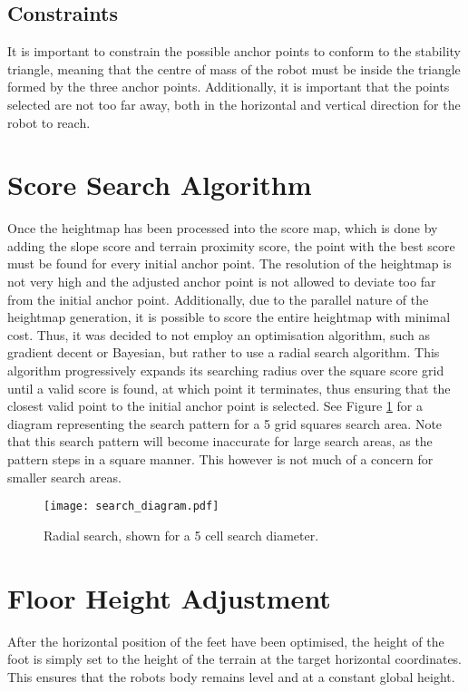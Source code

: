     \subsection{Constraints}
    It is important to constrain the possible anchor points to conform to the stability triangle, meaning that the centre of mass of the robot must be inside the triangle formed by the three anchor points. Additionally, it is important that the points selected are not too far away, both in the horizontal and vertical direction for the robot to reach.


\section{Score Search Algorithm} \label{sec:radial_search}
    Once the heightmap has been processed into the score map, which is done by adding the
    slope score and terrain proximity score, the point with the best score must be found for every initial anchor point. The resolution of the heightmap is not very high and the adjusted anchor point is not allowed to deviate too far from the initial anchor point. Additionally, due to the parallel nature of the heightmap generation, it is possible to score the entire heightmap with minimal cost. Thus, it was decided to not employ an optimisation algorithm, such as gradient decent or Bayesian, but rather to use a radial search algorithm. This algorithm progressively expands its searching radius over the square score grid until a valid score is found, at which point it
    terminates, thus ensuring that the closest valid point to the initial anchor point is selected. See Figure \ref{fig:radial_search} for a diagram representing the search pattern for a 5 grid squares search area. Note that this search pattern will become inaccurate for large search areas, as the pattern steps in a square manner. This however is not much of a concern for smaller search areas.

    \begin{figure}[h]
        \centering
        \texttt{[image: search\_diagram.pdf]}
        \caption{Radial search, shown for a 5 cell search diameter.}
        \label{fig:radial_search}
    \end{figure}

    \section{Floor Height Adjustment} \label{sec:height_adjust}
    After the horizontal position of the feet have been optimised, the height of the foot is simply set to the height of the terrain at the target horizontal coordinates. This ensures that the robots body remains level and at a constant global height.


